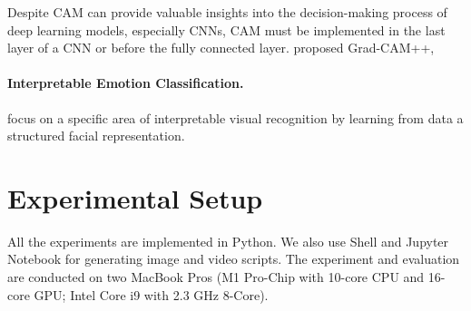 Despite CAM can provide valuable insights into the decision-making process of deep learning models, 
especially CNNs, 
CAM must be implemented in the last layer of a CNN or before the fully connected layer.
\citet{chattopadhay2018grad} proposed Grad-CAM++,

\paragraph{Interpretable Emotion Classification.}

\citet{YinTLS019} focus on a specific area of interpretable visual recognition by learning from data a structured facial representation. 
\citet{Malik0R21} 


\newpage

\section{Experimental Setup}
\label{sec:setup}

All the experiments are implemented in Python. 
We also use Shell and Jupyter Notebook for generating image and video scripts. 
The experiment and evaluation are conducted on two MacBook Pros 
(M1 Pro-Chip with 10-core CPU and 16-core GPU; Intel Core i9 with 2.3 GHz 8-Core). 

